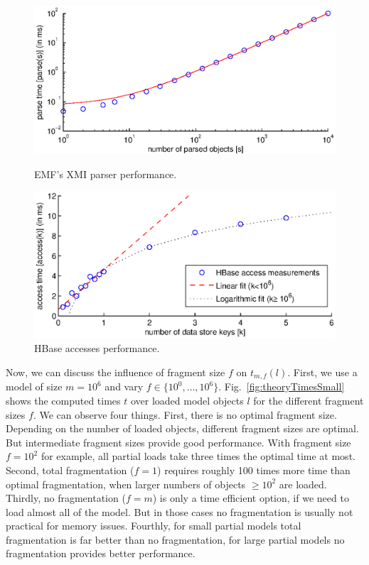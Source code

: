 \begin{figure}[bt]
\begin{minipage}[b]{0.48\linewidth}
\centering
\includegraphics[width=\linewidth]{figures/emfParsePerf}
\caption{EMF's XMI parser performance.}
\label{fig:emfParsePerf}
\end{minipage}
\hspace{0.02\linewidth}
\begin{minipage}[b]{0.48\linewidth}
\centering
\includegraphics[width=\linewidth]{figures/hbaseAccessPerf}
\caption{HBase accesses performance.}
\label{fig:hbaseAccessPerf}
\end{minipage}
\end{figure}

 
Now, we can discuss the influence of fragment size $f$ on $t_{m,f}(l)$. First, we use a model of size $m=10^6$ and vary $f\in\{10^0,\dots,10^6\}$. Fig.~\ref{fig:theoryTimesSmall} shows the computed times $t$ over loaded model objects $l$ for the different fragment sizes $f$. We can observe four things. First, there is no optimal fragment size. Depending on the number of loaded objects, different fragment sizes are optimal. But intermediate fragment sizes provide good performance. With fragment size $f=10^2$ for example, all partial loads take three times the optimal time at most. Second, total fragmentation ($f=1$) requires roughly 100 times more time than optimal fragmentation, when larger numbers of objects $\ge 10^2$ are loaded. Thirdly, no fragmentation ($f=m$) is only a time efficient option, if we need to load almost all of the model. But in those cases no fragmentation is usually not practical for memory issues. Fourthly, for small partial models total fragmentation is far better than no fragmentation, for large partial models no fragmentation provides better performance.

